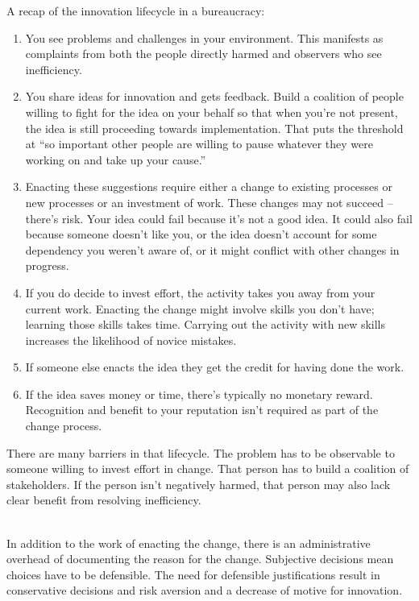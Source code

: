 A recap of the innovation lifecycle in a bureaucracy:
\begin{enumerate}
    \item You see problems and challenges in your environment. This manifests as complaints from both the people directly harmed and observers who see inefficiency.
    \item You share ideas for innovation and gets feedback. Build a coalition of people willing to fight for the idea on your behalf
    so that when you're not present, the idea is still proceeding towards implementation.  That puts the threshold at ``so important other people are willing to pause whatever they were working on and take up your cause.''
    \item Enacting these suggestions require either a change to existing processes or new processes or an investment of work. These changes may not succeed -- there's risk. Your idea could fail because it's not a good idea. It could also fail because someone doesn't like you, or the idea doesn't account for some dependency you weren't aware of, or it might conflict with other changes in progress.
    \item If you do decide to invest effort, the activity takes you away from your current work. Enacting the change might involve skills you don't have; learning those skills takes time. Carrying out the activity with new skills increases the likelihood of novice mistakes.
    \item If someone else enacts the idea they get the credit for having done the work.
    \item If the idea saves money or time, there's typically no monetary reward. Recognition and benefit to your reputation isn't required as part of the change process. 
\end{enumerate}

There are many barriers in that lifecycle. The problem has to be observable to someone willing to invest effort in change. That person has to build a coalition of stakeholders. If the person isn't negatively harmed, that person may also lack clear benefit from resolving inefficiency. 

\ \\

In addition to the work of enacting the change, there is an administrative overhead of documenting the reason for the change. 
Subjective decisions mean choices have to be defensible. 
The need for defensible justifications result in conservative decisions and risk aversion and a decrease of motive for innovation. 

